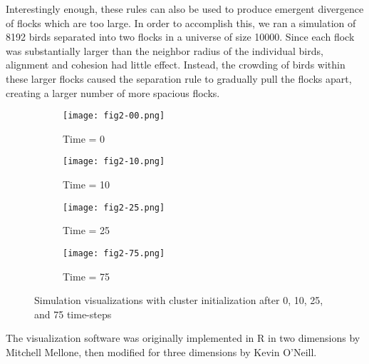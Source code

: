 Interestingly enough, these rules can also be used to produce emergent
divergence of flocks which are too large. In order to accomplish this,
we ran a simulation of 8192 birds separated into two flocks in a
universe of size 10000. Since each flock was substantially larger than
the neighbor radius of the individual birds, alignment and cohesion
had little effect. Instead, the crowding of birds within these larger
flocks caused the separation rule to gradually pull the flocks apart,
creating a larger number of more spacious flocks.

\begin{figure}[h!]
  \centering
  \begin{subfigure}{0.24\textwidth}
    \centering
    \texttt{[image: fig2-00.png]}
    \caption{Time = 0}
  \end{subfigure}
  \begin{subfigure}{0.24\textwidth}
    \centering
    \texttt{[image: fig2-10.png]}
    \caption{Time = 10}
  \end{subfigure}
  \begin{subfigure}{0.24\textwidth}
    \centering
    \texttt{[image: fig2-25.png]}
    \caption{Time = 25}
  \end{subfigure}
  \begin{subfigure}{0.24\textwidth}
    \centering
    \texttt{[image: fig2-75.png]}
    \caption{Time = 75}
  \end{subfigure}
  
  \caption{Simulation visualizations with cluster initialization after
    0, 10, 25, and 75 time-steps}
  \label{fig:visuals}
\end{figure}

The visualization software was originally implemented in R in two
dimensions by Mitchell Mellone, then modified for three dimensions by
Kevin O'Neill.
